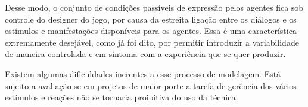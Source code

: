 Desse modo, o conjunto de condições passíveis de
expressão pelos agentes fica sob controle do designer do jogo, por
causa da estreita ligação entre os diálogos e os estímulos e
manifestações disponíveis para os agentes. Essa é uma característica
extremamente desejável, como já foi dito, por permitir introduzir a
variabilidade de maneira controlada e em sintonia com a experiência
que se quer produzir.

Existem algumas dificuldades inerentes a esse processo de
modelagem. Está sujeito a avaliação se em projetos de maior porte a
tarefa de gerência dos vários estímulos e reações não se tornaria
proibitiva do uso da técnica.

